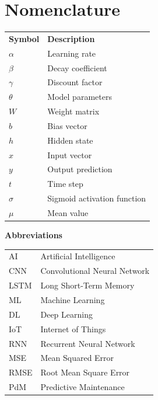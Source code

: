\documentclass[12pt,a4paper]{report}
\newcommand{\mainmattertitlespacing}{
    \titlespacing*{\chapter}{0pt}{45mm}{25mm}
}
\begin{document}
\cleardoublepage
\chapter*{Nomenclature}

\begin{tabular}{ll}
\textbf{Symbol} & \textbf{Description}\\[0.5cm]
$\alpha$ & Learning rate\\
$\beta$ & Decay coefficient\\
$\gamma$ & Discount factor\\
$\theta$ & Model parameters\\
$W$ & Weight matrix\\
$b$ & Bias vector\\
$h$ & Hidden state\\
$x$ & Input vector\\
$y$ & Output prediction\\
$t$ & Time step\\
$\sigma$ & Sigmoid activation function\\
$\mu$ & Mean value\\
\end{tabular}

\vspace{1cm}

\textbf{Abbreviations}

\begin{tabular}{ll}
AI & Artificial Intelligence\\
CNN & Convolutional Neural Network\\
LSTM & Long Short-Term Memory\\
ML & Machine Learning\\
DL & Deep Learning\\
IoT & Internet of Things\\
RNN & Recurrent Neural Network\\
MSE & Mean Squared Error\\
RMSE & Root Mean Square Error\\
PdM & Predictive Maintenance\\
\end{tabular}

\cleardoublepage

\setcounter{page}{1}
\mainmattertitlespacing %
\end{document}
